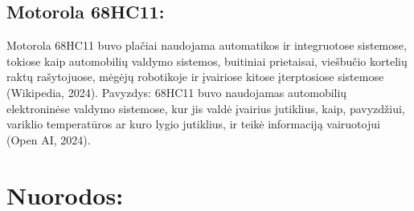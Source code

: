 \documentclass[a4paper,12pt]{article}
\begin{document}
\subsection{Motorola 68HC11:}
Motorola 68HC11 buvo plačiai naudojama automatikos ir integruotose sistemose, tokiose kaip automobilių valdymo sistemos, buitiniai prietaisai, viešbučio kortelių raktų rašytojuose, mėgėjų robotikoje ir įvairiose kitose įterptosiose sistemose (Wikipedia, 2024). Pavyzdys: 68HC11 buvo naudojamas automobilių elektroninėse valdymo sistemose, kur jis valdė įvairius jutiklius, kaip, pavyzdžiui, variklio temperatūros ar kuro lygio jutiklius, ir teikė informaciją vairuotojui (Open AI, 2024).

\section{Nuorodos:}
\end{document}
